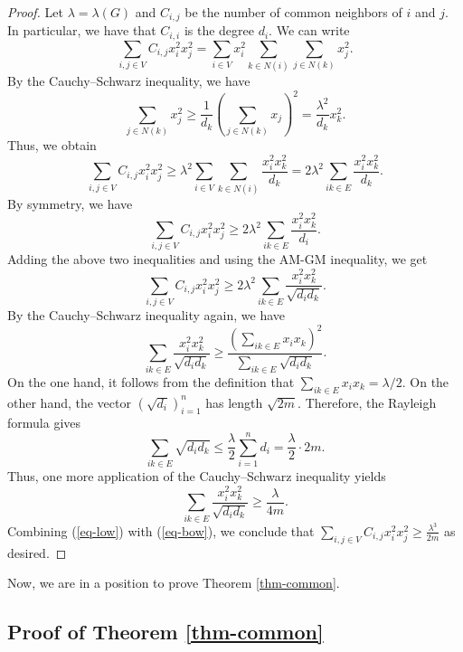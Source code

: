 \documentclass[11pt,a4paper]{article}
\theoremstyle{definition}
\theoremstyle{remark}
\begin{document}
\begin{proof}
Let $\lambda =\lambda (G)$ and $C_{i, j}$ be the number of common neighbors of $i$ and $j$. In particular, we have that  $C_{i, i} $ is the degree $ d_i$. 
We can write
$$\sum_{i, j\in V} C_{i, j} x_i^2 x_j^2 
= \sum_{i\in V} x_i^2 \sum_{k \in N(i)} \sum_{j \in N(k)} x_j^2.$$
By the Cauchy--Schwarz inequality, we have
$$\sum_{j \in N(k)} x_j^2 \geq \frac{1}{d_k} \left(\sum_{j \in N(k)} x_j\right)^2 = \frac{\lambda^2}{d_k} x_k^2.$$
Thus, we obtain 
$$\sum_{i, j\in V} C_{i, j} x_i^2 x_j^2 \geq 
\lambda^2 \sum_{i\in V} \sum_{k \in N(i)} \frac{x_i^2 x_k^2}{d_k} = 2\lambda^2 \sum_{ik \in E} \frac{x_i^2 x_k^2}{d_k}.$$
By symmetry, we have 
\[ \sum_{i, j\in V} C_{i, j} x_i^2 x_j^2 \geq 2\lambda^2 \sum_{ik \in E} \frac{x_i^2 x_k^2}{d_i}.\] 
Adding the above two inequalities and using the AM-GM inequality, we get 
\begin{equation} \label{eq-low}
    \sum_{i, j\in V} C_{i, j} x_i^2 x_j^2 \geq 2\lambda^2  \sum_{ik \in E} \frac{x_i^2 x_k^2}{\sqrt{d_i d_k}}.
\end{equation}
By the Cauchy--Schwarz inequality again, we have
\begin{equation*} 
    \sum_{ik \in E} \frac{x_i^2 x_k^2}{\sqrt{d_i d_k}} \geq \frac{\left(\sum_{i k \in E} x_i x_k\right)^2}{\sum_{ik \in E} \sqrt{d_i d_k}}.
\end{equation*}
On the one hand, it follows from the definition that $\sum_{ik \in E} x_i x_k = \lambda / 2.$
On the other hand, the vector $ (\sqrt{d_i})_{i=1}^n$ has length $\sqrt{2m}$. Therefore, the Rayleigh formula gives 
$$\sum_{ik \in E} \sqrt{d_i d_k} \leq 
\frac{\lambda}{2} \sum_{i=1}^n d_i =
\frac{\lambda}{2} \cdot 2m .$$
Thus, one more application of the Cauchy--Schwarz inequality yields
\begin{equation} \label{eq-bow}
   \sum_{ik \in E} \frac{x_i^2 x_k^2}{\sqrt{d_i d_k}} \geq \frac{\lambda}{4m}. 
\end{equation}
Combining  (\ref{eq-low}) 
with (\ref{eq-bow}), we conclude that $\sum_{i, j\in V} C_{i, j} x_i^2 x_j^2 \geq \frac{\lambda^3}{2m}$ as desired.
\end{proof}



Now, we are in a position to prove Theorem \ref{thm-common}. 

\subsection{Proof of Theorem \ref{thm-common}}
\end{document}
